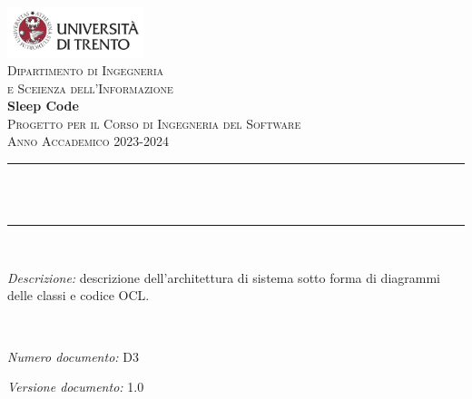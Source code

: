 \begin{titlepage}
    \newcommand{\HRule}{\rule{\linewidth}{0.3mm}} %
    \center %
    
    \includegraphics[width=0.3\textwidth]{materiale/elementi-copertina/UniTrento_logo_ITA_colore.png}\\[0.5cm]
    \textsc{\Large Dipartimento di Ingegneria\\e Sceienza dell'Informazione}\\[1.5cm]
    
    {\Huge\textbf{Sleep Code}}\\[0.5cm]
    \textsc{\large Progetto per il Corso di Ingegneria del Software}\\
    \textsc{\large Anno Accademico 2023-2024}\\[0.5cm]
    
    
    \HRule\\[0.4cm]
    {\huge\bfseries \@title}\\[0.1cm]
    \HRule\\[1cm]
    
    \begin{minipage}{\textwidth}
    \textit{Descrizione:} descrizione dell'architettura di sistema sotto forma di diagrammi delle classi e codice OCL.
    \end{minipage}\\[1.5cm]
    
    
    \begin{minipage}{0.4\textwidth}
    \begin{flushleft}
    \large
    \textit{Numero documento:} D3
    \end{flushleft}
    \end{minipage}
    \begin{minipage}{0.4\textwidth}
    \begin{flushright}
    \large
    \textit{Versione documento:} 1.0
    \end{flushright}
    \end{minipage}\\[1.5cm]
    

\end{titlepage}
